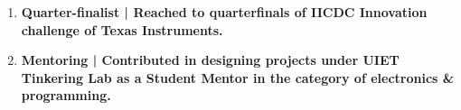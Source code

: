 \documentclass[11pt]{article}
\begin{document}
\begin{minipage}{18cm}
\begin{enumerate}[leftmargin=*]
\item \bfseries Quarter-finalist | \mdseries Reached to quarterfinals of IICDC Innovation challenge of Texas Instruments.
\item \bfseries Mentoring \mdseries | Contributed in designing projects under UIET Tinkering Lab as a Student Mentor in the category of electronics \& programming.
\end{enumerate}










\end{minipage}
\end{document}
